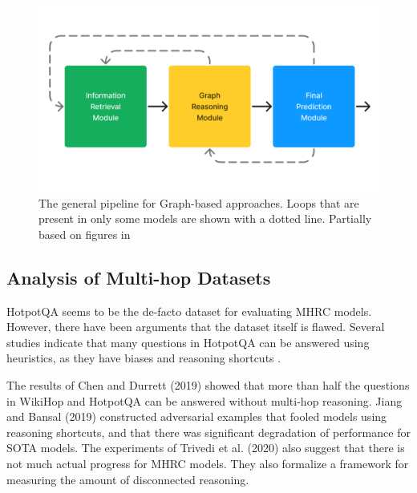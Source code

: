 \documentclass[sigplan,screen,nonacm]{acmart}
\begin{document}
\begin{figure}[t] %
  \centering
  \includegraphics[width=\linewidth]{fig/fig_general_pipeline2.png} %
  \caption{The general pipeline for Graph-based approaches. Loops that are present in only some models are shown with a dotted line. Partially based on figures in \cite{RN165}}
  \label{fig:general_pipeline} %
\end{figure}

\subsection{Analysis of Multi-hop Datasets}

HotpotQA seems to be the de-facto dataset for evaluating MHRC models. However, there have been arguments that the dataset itself is flawed. 
Several studies \cite{RN176, RN175, RN154, RN150} indicate that many questions in HotpotQA can be answered using heuristics, 
as they have biases and reasoning shortcuts \cite{RN177}.

The results of Chen and Durrett (2019) \cite{RN154} showed that more than half the questions in WikiHop and HotpotQA can be answered without
multi-hop reasoning. Jiang and Bansal (2019) \cite{RN176} constructed adversarial examples that fooled models using reasoning shortcuts, and that
there was significant degradation of performance for SOTA models. The experiments of Trivedi et al. (2020) \cite{RN175} also suggest that there is not
much actual progress for MHRC models. They also formalize a framework for measuring the amount of disconnected reasoning.
\end{document}
